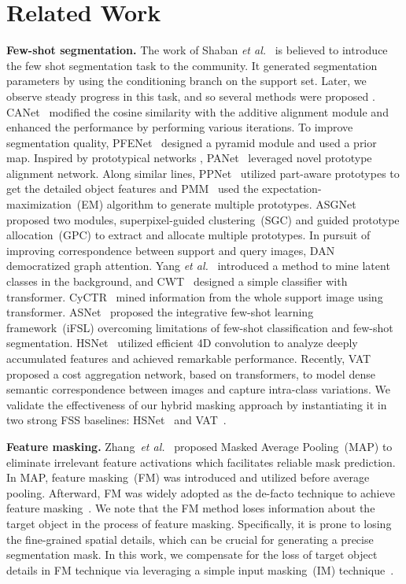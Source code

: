 \documentclass[runningheads]{llncs}
\begin{document}
\section{Related Work}

\noindent \textbf{Few-shot segmentation.} 
The work of Shaban \textit{et al.}~\cite{OSLSM} is believed to introduce the few shot segmentation task to the community. It generated segmentation parameters by using the conditioning branch on the support set. 
Later, we observe steady progress in this task, and so several methods were proposed \cite{Co-FCN,AMP-2,PMM,FWB,PANet,CANet,PFENet,DAN,RePRI,SAGNN,FSOT,Zhang2020SGOneSG,CWT,ASGNet,HSNet}. CANet~\cite{CANet} modified the cosine similarity with the additive alignment module and enhanced the performance by performing various iterations. To improve segmentation quality, PFENet~\cite{PFENet} designed a pyramid module and used a prior map. Inspired by prototypical networks \cite{snell2017prototypical}, PANet~\cite{PANet} leveraged novel prototype alignment network. Along similar lines, PPNet~\cite{PPNet} utilized part-aware prototypes to get the detailed object features and PMM~\cite{PMM} used the expectation-maximization~(EM) algorithm to generate multiple prototypes. ASGNet~\cite{ASGNet} proposed two modules, superpixel-guided clustering~(SGC) and guided prototype allocation~(GPC) to extract and allocate multiple prototypes. In pursuit of improving correspondence between support and query images,  DAN~\cite{DAN} democratized graph attention. Yang \textit{et al.}~\cite{yang2021mining} introduced a method to mine latent classes in the background, and CWT~\cite{CWT} designed a simple classifier with transformer. CyCTR~\cite{zhang2021fewshot} mined information from the whole support image using transformer. ASNet~\cite{ASNet} proposed the integrative few-shot learning framework~(iFSL) overcoming limitations of few-shot classification and few-shot segmentation. HSNet~\cite{HSNet} utilized efficient 4D convolution to analyze deeply accumulated features and achieved remarkable performance. Recently, VAT~\cite{VAT} proposed a cost aggregation network, based on transformers, to model dense semantic correspondence between images and capture intra-class variations. We validate the effectiveness of our hybrid masking approach by instantiating it in two strong FSS baselines: HSNet~\cite{HSNet} and VAT~\cite{VAT}.


\noindent \textbf{Feature masking.}
Zhang~\textit{et al.}~\cite{Zhang2020SGOneSG} proposed Masked Average Pooling~(MAP) to eliminate irrelevant feature activations which facilitates reliable mask prediction. In MAP, feature masking~(FM) was introduced and utilized before average pooling. Afterward, FM was widely adopted as the de-facto technique to achieve feature masking~\cite{Zhang2020SGOneSG,CANet,PFENet,PANet,yang2021mining,HSNet, VAT, ASNet}. We note that the FM method loses information about the target object in the process of feature masking. Specifically, it is prone to losing the fine-grained spatial details, which can be crucial for generating a precise segmentation mask. In this work, we compensate for the loss of target object details in FM technique via leveraging a simple input masking~(IM) technique~\cite{OSLSM}. 
\end{document}
